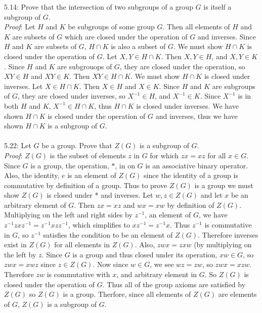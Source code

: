 \documentclass{scrartcl}
\begin{document}
5.14: Prove that the intersection of two subgroups of a group $G$ is itself a subgroup of $G$.\\

\emph{Proof}: Let $H$ and $K$ be subgroups of some group $G$. Then all elements of $H$ and $K$ are subsets of $G$ which are closed under the operation of $G$ and inverses. Since $H$ and $K$ are subsets of $G$, $H \cap K$ is also a subset of $G$. We must show $H \cap K$ is closed under the operation of $G$. Let $X,Y \in H \cap K$. Then $X,Y \in H$, and $X,Y \in K$. Since $H$ and $K$ are subgrouops of $G$, they are closed under the operation, so $XY \in H$ and $XY \in K$. Then $XY \in H \cap K$.  We must show $H \cap K$ is closed under inverses. Let $X \in H\cap K$. Then $X \in H$ and $X \in K$. Since $H$ and $K$ are subgroups of $G$, they are closed under inverses, so $X^{-1} \in H$, and $X^{-1} \in K$. Since $X^{-1}$ is in both $H$ and $K$, $X^{-1} \in H \cap K$, thus $H \cap K$ is closed under inverses. We have shown $H \cap K$ is closed under the operation of $G$ and inverses, thus we have shown $H \cap K$ is a subgroup of $G$.\\\\

5.22: Let $G$ be a group. Prove that $Z(G)$ is a subgroup of $G$.\\

\emph{Proof}: $Z(G)$ is the subset of elements $z$ in $G$ for which $zx=xz$ for all $x \in G$. Since $G$ is a group, the operation, $*$, in on $G$ is an associative binary operator. Also, the identity, $e$ is an element of $Z(G)$ since the identity of a group is commutative by definition of a group. Thus to prove $Z(G)$ is a group we must show $Z(G)$ is closed under * and inverses. Let $w,z \in Z(G)$ and let $x$ be an arbitrary element of $G$. Then $zx=xz$ and $wx=xw$ by definition of $Z(G)$. Multiplying on the left and right sides by $z^{-1}$, an element of $G$, we have $z^{-1}zxz^{-1}=z^{-1}xzz^{-1}$, which simplifies to $xz^{-1}=z^{-1}x$. Thus $z^{-1}$ is commutative in $G$, so $z^{-1}$ satisfies the condition to be an element of $Z(G)$. Therefore inverses exist in $Z(G)$ for all elements in $Z(G)$. Also, $zwx=zxw$ (by multiplying on the left by $z$. Since $G$ is a group and thus closed under its operation, $xw \in G$, so $zwx=xwz$ since $z \in Z(G)$. Now since $w \in G$, we see $wz=zw$, so $zwx=xzw$. Therefore $zw$ is commutative with $x$, and arbitrary element in $G$. So $Z(G)$ is closed under the operation of $G$. Thus all of the group axioms are satisfied by $Z(G)$ so $Z(G)$ is a group. Therfore, since all elements of $Z(G)$ are elements of $G$, $Z(G)$ is a subgroup of $G$.
 
\end{document}
